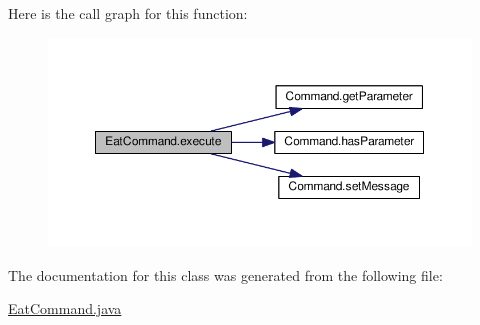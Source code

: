 Here is the call graph for this function\-:
\nopagebreak
\begin{figure}[H]
\begin{center}
\leavevmode
\includegraphics[width=350pt]{classEatCommand_ab78ece6b005359a83696998a37f0ae71_cgraph}
\end{center}
\end{figure}




The documentation for this class was generated from the following file\-:\begin{DoxyCompactItemize}
\item 
\hyperlink{EatCommand_8java}{Eat\-Command.\-java}\end{DoxyCompactItemize}
